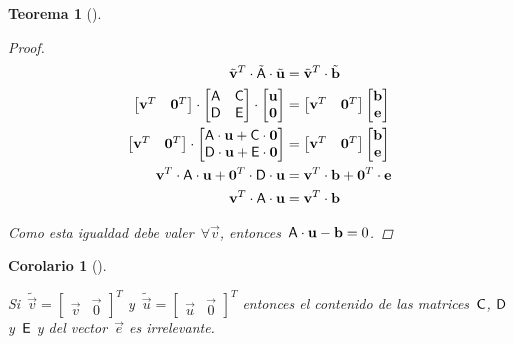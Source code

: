 \documentclass[
  12pt,
  a4paper,
  table]{scrbook}
\theoremstyle{plain}
\theoremstyle{definition}
\theoremstyle{plain}
\newtheorem{theorem}{Teorema}[chapter]
\theoremstyle{plain}
\newtheorem{corollary}{Corolario}[chapter]
\theoremstyle{remark}
\begin{document}
\begin{theorem}[]
\begin{proof}
\[
\begin{aligned}
\tilde{\mathbf{v}}^T \cdot \tilde{\mathsf{A}} \cdot \tilde{\mathbf{u}}
&=
\tilde{\mathbf{v}}^T \cdot \tilde{\mathbf{b}} \\
\begin{bmatrix} \mathbf{v}^T & \mathbf{0}^T \end{bmatrix}
\cdot
\begin{bmatrix}
\mathsf{A} & \mathsf{C} \\
\mathsf{D} & \mathsf{E} \\
\end{bmatrix}
\cdot
\begin{bmatrix}
\mathbf{u} \\
\mathbf{0}
\end{bmatrix}
& =
\begin{bmatrix} \mathbf{v}^T & \mathbf{0}^T \end{bmatrix}
\begin{bmatrix}
\mathbf{b} \\
\mathbf{e}
\end{bmatrix}
\\
\begin{bmatrix} \mathbf{v}^T & \mathbf{0}^T \end{bmatrix}
\cdot
\begin{bmatrix}
\mathsf{A} \cdot \mathbf{u} + \mathsf{C} \cdot \mathbf{0} \\
\mathsf{D} \cdot \mathbf{u} + \mathsf{E} \cdot \mathbf{0} \\
\end{bmatrix}
&=
\begin{bmatrix} \mathbf{v}^T & \mathbf{0}^T \end{bmatrix}
\begin{bmatrix}
\mathbf{b} \\
\mathbf{e}
\end{bmatrix}
\\
\mathbf{v}^T \cdot \mathsf{A} \cdot \mathbf{u} + \mathbf{0}^T \cdot \mathsf{D} \cdot \mathbf{u}
&=
\mathbf{v}^T \cdot \mathbf{b} + \mathbf{0}^T \cdot \mathbf{e}\\
\mathbf{v}^T \cdot \mathsf{A} \cdot \mathbf{u}
&=
\mathbf{v}^T \cdot \mathbf{b}\\
\end{aligned}
\]

Como esta igualdad debe valer~\(\forall \vec{v}\),
entonces~\(\mathsf{A} \cdot \mathbf{u} - \mathbf{b} = 0\).

\end{proof}

\end{theorem}

\begin{corollary}[]\protect\hypertarget{cor-irrelevancia}{}\label{cor-irrelevancia}

Si~\(\tilde{\vec{v}}=\begin{bmatrix} \vec{v} & \vec{0}\end{bmatrix}^T\)
y~\(\tilde{\vec{u}}=\begin{bmatrix} \vec{u} & \vec{0}\end{bmatrix}^T\)
entonces el contenido de las matrices~\(\mathsf{C}\), \(\mathsf{D}\)
y~\(\mathsf{E}\) y del vector~\(\vec{e}\) es irrelevante.

\end{corollary}
\end{document}
